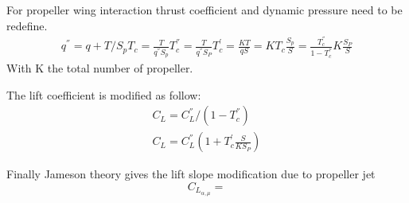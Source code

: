 For propeller wing interaction thrust coefficient and dynamic pressure need to be redefine.
\begin{eqnarray}
q^{''} = q + T/S_p
T_c=\frac{T}{q^{''} S_p}
T_c^{''} =\frac{T}{q^{''}S_P}
T_c^' = \frac{KT}{qS}=KT_c\frac{S_p}{S} = \frac{T_c^{''}}{1-T_c^{''}}K\frac{S_P}{S}
\end{eqnarray}
With K the total number of propeller.

The lift coefficient is modified as follow:
\begin{eqnarray}
C_L= C_L^{''}/(1-T_c^{''})\\
C_L = C_L^{''}(1+T_c^'\frac{S}{KS_P})
\end{eqnarray}

Finally Jameson theory gives the lift slope modification due to propeller jet
\begin{equation}
C_{L_{\alpha,\mu}}=
\end{equation}
